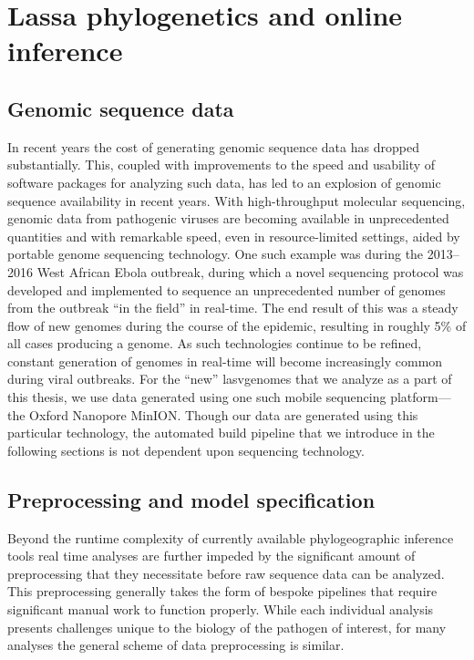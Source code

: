 \section{Lassa phylogenetics and online inference}

\subsection{Genomic sequence data}

In recent years the cost of generating genomic sequence data has dropped substantially\cite{sboner2011real}.
This, coupled with improvements to the speed and usability of software packages for analyzing such data, has led to an explosion of genomic sequence availability in recent years.
With high-throughput molecular sequencing, genomic data from pathogenic viruses are becoming available in unprecedented quantities and with remarkable speed, even in resource-limited settings, aided by portable genome sequencing technology.
One such example was during the 2013--2016 West African Ebola outbreak, during which a novel sequencing protocol was developed and implemented to sequence an unprecedented number of genomes from the outbreak ``in the field'' in real-time\cite{quick2016real}.
The end result of this was a steady flow of new genomes during the course of the epidemic, resulting in roughly 5\% of all cases producing a genome\cite{dudas2017virus}.
As such technologies continue to be refined, constant generation of genomes in real-time will become increasingly common during viral outbreaks\cite{jain2016oxford}.
For the ``new'' \gls{lasv}genomes that we analyze as a part of this thesis, we use data generated using one such mobile sequencing platform---the Oxford Nanopore MinION.
Though our data are generated using this particular technology, the automated build pipeline that we introduce in the following sections is not dependent upon sequencing technology.

\subsection{Preprocessing and model specification}

Beyond the runtime complexity of currently available phylogeographic inference tools real time analyses are further impeded by the significant amount of preprocessing that they necessitate before raw sequence data can be analyzed.
This preprocessing generally takes the form of bespoke pipelines that require significant manual work to function properly.
While each individual analysis presents challenges unique to the biology of the pathogen of interest, for many analyses the general scheme of data preprocessing is similar.

